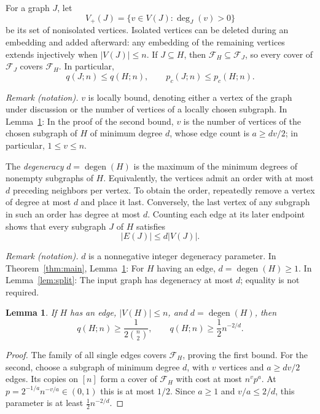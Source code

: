 \documentclass[11pt]{article}
\newtheorem{lemma}[theorem]{Lemma}
\theoremstyle{remark}
\numberwithin{equation}{section}
\newcommand{\calF}{\mathcal F}
\DeclareMathOperator{\degen}{degen}
\begin{document}
For a graph $J$, let
\[
 V_+(J)=\{v\in V(J):\deg_J(v)>0\}
\]
be its set of nonisolated vertices. Isolated vertices can be
deleted during an embedding and added afterward: any embedding
of the remaining vertices extends injectively when $|V(J)|\leq n$.
If $J\subseteq H$, then $\calF_H\subseteq\calF_J$, so every
cover of $\calF_J$ covers $\calF_H$. In particular,
\begin{equation}\label{eq:monotonicity}
 q(J;n)\leq q(H;n),\qquad p_c(J;n)\leq p_c(H;n).
\end{equation}

\noindent\textit{Remark (notation).} $v$ is locally bound, denoting either a vertex of the graph under discussion or the number of vertices of a locally chosen subgraph. In Lemma~\ref{lem:q-lower}: In the proof of the second bound, $v$ is the number of vertices of the chosen subgraph of $H$ of minimum degree $d$, whose edge count is $a\geq dv/2$; in particular, $1\leq v\leq n$.


The \emph{degeneracy} $d=\degen(H)$ is the maximum of the
minimum degrees of nonempty subgraphs of $H$. Equivalently,
the vertices admit an order with at most $d$ preceding neighbors
per vertex. To obtain the order, repeatedly remove a vertex of
degree at most $d$ and place it last. Conversely, the last vertex
of any subgraph in such an order has degree at most $d$.
Counting each edge at its later endpoint shows that every
subgraph $J$ of $H$ satisfies
\begin{equation}\label{eq:edge-bound}
 |E(J)|\leq d|V(J)|.
\end{equation}

\noindent\textit{Remark (notation).} $d$ is a nonnegative integer degeneracy parameter. In Theorem~\ref{thm:main}, Lemma~\ref{lem:q-lower}: For $H$ having an edge, $d=\degen(H)\geq1$. In Lemma~\ref{lem:split}: The input graph has degeneracy at most $d$; equality is not required.


\begin{lemma}\label{lem:q-lower}
If $H$ has an edge, $|V(H)|\leq n$, and $d=\degen(H)$, then
\begin{equation}\label{eq:q-lower}
 q(H;n)\geq\frac1{2\binom n2},\qquad
 q(H;n)\geq\frac12 n^{-2/d}.
\end{equation}
\end{lemma}
\begin{proof}
The family of all single edges covers $\calF_H$, proving the
first bound. For the second, choose a subgraph of minimum degree
$d$, with $v$ vertices and $a\geq dv/2$ edges. Its copies on
$[n]$ form a cover of $\calF_H$ with cost at most $n^vp^a$.
At $p=2^{-1/a}n^{-v/a}\in(0,1)$ this is at most $1/2$.
Since $a\geq1$ and $v/a\leq2/d$, this parameter is at least
$\frac12n^{-2/d}$.
\end{proof}
\end{document}
